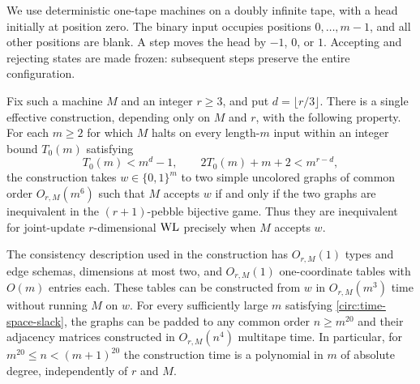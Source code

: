 We use deterministic one-tape machines on a doubly infinite tape, with a
head initially at position zero. The binary input occupies positions
$0,\ldots,m-1$, and all other positions are blank. A step moves the head
by $-1$, $0$, or $1$. Accepting and rejecting states are made frozen:
subsequent steps preserve the entire configuration.

\begin{theorem}
\label{circ:computation}
Fix such a machine $M$ and an integer $r\geq3$, and put
$d=\lfloor r/3\rfloor$. There is a single effective construction,
depending only on $M$ and $r$, with the following property. For each
$m\geq2$ for which $M$ halts on every length-$m$ input within an integer
bound $T_0(m)$ satisfying
\begin{equation}
\label{circ:time-space-slack}
 T_0(m)<m^d-1,
 \qquad
 2T_0(m)+m+2<m^{r-d},
\end{equation}
the construction takes $w\in\{0,1\}^m$ to two simple uncolored graphs of
common order $O_{r,M}(m^6)$ such that $M$ accepts $w$
if and only if the two graphs are inequivalent in the $(r+1)$-pebble
bijective game.
Thus they are inequivalent for joint-update $r$-dimensional $\mathrm{WL}$ precisely
when $M$ accepts $w$.

The consistency description used in the construction has
$O_{r,M}(1)$ types and edge schemas, dimensions at most two, and
$O_{r,M}(1)$ one-coordinate tables with $O(m)$ entries each. These tables
can be constructed from $w$ in $O_{r,M}(m^3)$ time without running $M$ on
$w$. For every sufficiently large $m$ satisfying
\eqref{circ:time-space-slack}, the graphs can be padded to any
common order $n\geq m^{20}$ and their adjacency matrices constructed in
$O_{r,M}(n^4)$ multitape time. In particular, for
$m^{20}\leq n<(m+1)^{20}$ the construction time is a polynomial in $m$
of absolute degree, independently of $r$ and $M$.
\end{theorem}

